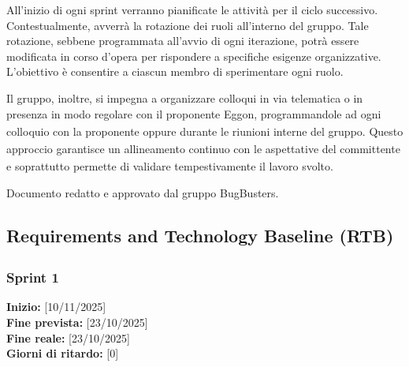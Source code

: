 \documentclass[a4paper,12pt]{article}
\begin{document}
All'inizio di ogni sprint verranno pianificate le attività per il ciclo successivo. Contestualmente, avverrà la rotazione dei ruoli all'interno del gruppo. Tale rotazione, sebbene programmata all'avvio di ogni iterazione, potrà essere modificata in corso d'opera per rispondere a specifiche esigenze organizzative. L'obiettivo è consentire a ciascun membro di sperimentare ogni ruolo.

Il gruppo, inoltre, si impegna a organizzare colloqui in via telematica o in presenza in modo regolare con il proponente\textsubscript{} Eggon, programmandole ad ogni colloquio con la proponente\textsubscript{} oppure durante le riunioni interne del gruppo. Questo approccio garantisce un allineamento continuo con le aspettative del committente\textsubscript{} e soprattutto permette di validare tempestivamente il lavoro svolto.

\vfill
\begin{center}
    {\small\color{darkgray} Documento redatto e approvato dal gruppo BugBusters.}
\end{center}

\newpage
\subsection{Requirements and Technology Baseline\textsubscript{} (RTB)}

\subsubsection{Sprint 1}

\textbf{Inizio:} [10/11/2025] \\
\textbf{Fine prevista:} [23/10/2025] \\
\textbf{Fine reale:} [23/10/2025] \\
\textbf{Giorni di ritardo:} [0]
\end{document}
